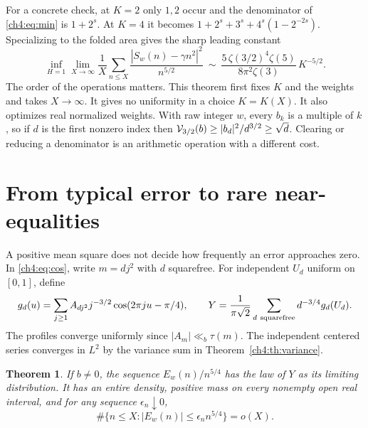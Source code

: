 \documentclass[11pt,a4paper,oneside,openany]{report}
\newtheorem{theorem}{Theorem}[section]
\theoremstyle{remark}\newtheorem{remark}[theorem]{Remark}
\numberwithin{equation}{section}
\begin{document}
For a concrete check, at $K=2$ only $1,2$ occur and the denominator of \eqref{ch4:eq:min} is $1+2^s$. At $K=4$ it becomes $1+2^s+3^s+4^s(1-2^{-2s})$.
Specializing to the folded area gives the sharp leading constant
\[
 \inf_{H=1}\lim_{X\to\infty}\frac1X\sum_{n\le X}\frac{|S_w(n)-\gamma n^2|^2}{n^{5/2}}
 \ \sim\ \frac{5\,\zeta(3/2)^4\zeta(5)}{8\pi^2\zeta(3)}\,K^{-5/2}.
\]
The order of the operations matters. This theorem first fixes $K$ and the weights and takes $X\to\infty$. It gives no uniformity in a choice $K=K(X)$. It also optimizes real normalized weights. With raw integer $w$, every $b_k$ is a multiple of $k$, so if $d$ is the first nonzero index then $\mathcal V_{3/2}(b)\ge |b_d|^2/d^{3/2}\ge\sqrt d$. Clearing or reducing a denominator is an arithmetic operation with a different cost.

\section{From typical error to rare near-equalities}\label{ch4:sec:law}
A positive mean square does not decide how frequently an error approaches zero. In \eqref{ch4:eq:cos}, write $m=dj^2$ with $d$ squarefree. For independent $U_d$ uniform on $[0,1]$, define
\[
 g_d(u)=\sum_{j\ge1}A_{dj^2}j^{-3/2}\cos(2\pi ju-\pi/4),\qquad
 Y=\frac{1}{\pi\sqrt2}\sum_{d\ {\rm squarefree}}d^{-3/4}g_d(U_d).
\]
The profiles converge uniformly since $|A_m|\ll_b\tau(m)$. The independent centered series converges in $L^2$ by the variance sum in Theorem~\ref{ch4:th:variance}.
\begin{theorem}\label{ch4:th:law}
If $b\ne0$, the sequence $E_w(n)/n^{5/4}$ has the law of $Y$ as its limiting distribution. It has an entire density, positive mass on every nonempty open real interval, and for any sequence $\epsilon_n\downarrow0$,
\[
 \#\{n\le X:|E_w(n)|\le\epsilon_n n^{5/4}\}=o(X).
\]
\end{theorem}
\end{document}
